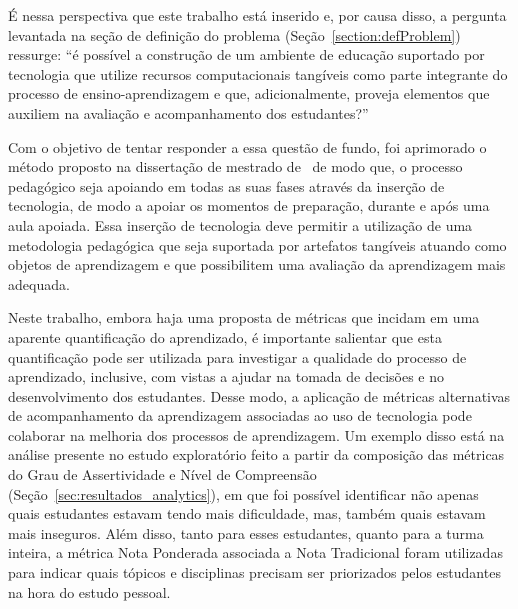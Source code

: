 
É nessa perspectiva que este trabalho está inserido e, por causa disso, a pergunta levantada na seção de definição do problema (Seção~\ref{section:defProblem}) ressurge: ``é possível a construção de um ambiente de educação suportado por tecnologia que utilize recursos computacionais tangíveis como parte integrante do processo de ensino-aprendizagem e que, adicionalmente, proveja elementos que auxiliem na avaliação e acompanhamento dos estudantes?''

Com o objetivo de tentar responder a essa questão de fundo, foi aprimorado o método proposto na dissertação de mestrado de~\cite{Leitao:2014} de modo 
que, o processo pedagógico seja apoiando em todas as suas fases através da inserção de tecnologia, de modo a apoiar os momentos de preparação, durante e após uma aula apoiada. Essa inserção de tecnologia 
deve permitir a utilização de uma metodologia pedagógica que seja suportada por artefatos tangíveis atuando como objetos de aprendizagem e que possibilitem uma avaliação da aprendizagem mais adequada.

Neste trabalho, embora haja uma proposta de métricas que incidam em uma aparente quantificação do aprendizado, é importante salientar que esta quantificação pode ser utilizada para investigar a qualidade do processo de aprendizado, inclusive, com vistas a ajudar na tomada de decisões e no desenvolvimento dos estudantes. Desse modo, a aplicação de métricas alternativas de acompanhamento da aprendizagem associadas ao uso de tecnologia pode colaborar na melhoria dos processos de aprendizagem. Um exemplo disso está na análise presente no estudo exploratório feito a partir da composição das métricas do Grau de Assertividade e Nível de Compreensão (Seção~\ref{sec:resultados_analytics}), em que foi possível identificar não apenas quais estudantes estavam tendo mais dificuldade, mas, também quais estavam mais inseguros. Além disso, tanto para esses estudantes, quanto para a turma inteira, a métrica Nota Ponderada associada a Nota Tradicional foram utilizadas para indicar quais tópicos e disciplinas precisam ser priorizados pelos estudantes na hora do estudo pessoal.

